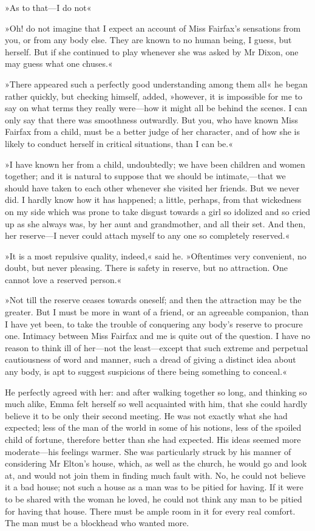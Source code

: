 »As to that—I do not\longdash«

»Oh! do not imagine that I expect an account of Miss Fairfax's sensations from you, or from any body else. They are known to no human being, I guess, but herself. But if she continued to play whenever she was asked by Mr Dixon, one may guess what one chuses.«

»There appeared such a perfectly good understanding among them all\longdash« he began rather quickly, but checking himself, added, »however, it is impossible for me to say on what terms they really were—how it might all be behind the scenes. I can only say that there was smoothness outwardly. But you, who have known Miss Fairfax from a child, must be a better judge of her character, and of how she is likely to conduct herself in critical situations, than I can be.«

»I have known her from a child, undoubtedly; we have been children and women together; and it is natural to suppose that we should be intimate,—that we should have taken to each other whenever she visited her friends. But we never did. I hardly know how it has happened; a little, perhaps, from that wickedness on my side which was prone to take disgust towards a girl so idolized and so cried up as she always was, by her aunt and grandmother, and all their set. And then, her reserve—I never could attach myself to any one so completely reserved.«

»It is a most repulsive quality, indeed,« said he. »Oftentimes very convenient, no doubt, but never pleasing. There is safety in reserve, but no attraction. One cannot love a reserved person.«

»Not till the reserve ceases towards oneself; and then the attraction may be the greater. But I must be more in want of a friend, or an agreeable companion, than I have yet been, to take the trouble of conquering any body's reserve to procure one. Intimacy between Miss Fairfax and me is quite out of the question. I have no reason to think ill of her—not the least—except that such extreme and perpetual cautiousness of word and manner, such a dread of giving a distinct idea about any body, is apt to suggest suspicions of there being something to conceal.«

He perfectly agreed with her: and after walking together so long, and thinking so much alike, Emma felt herself so well acquainted with him, that she could hardly believe it to be only their second meeting. He was not exactly what she had expected; less of the man of the world in some of his notions, less of the spoiled child of fortune, therefore better than she had expected. His ideas seemed more moderate—his feelings warmer. She was particularly struck by his manner of considering Mr Elton's house, which, as well as the church, he would go and look at, and would not join them in finding much fault with. No, he could not believe it a bad house; not such a house as a man was to be pitied for having. If it were to be shared with the woman he loved, he could not think any man to be pitied for having that house. There must be ample room in it for every real comfort. The man must be a blockhead who wanted more.

